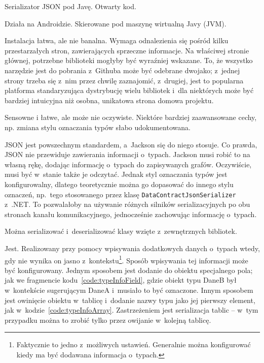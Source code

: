 \begin{description}
Serializator JSON pod Javę. Otwarty kod.

Działa na Androidzie. Skierowane pod maszynę wirtualną Javy (JVM).

Instalacja łatwa, ale nie banalna.
Wymaga odnalezienia się pośród kilku przestarzałych stron, zawierających sprzeczne informacje.
Na właściwej stronie głównej, potrzebne biblioteki mogłyby być wyraźniej wskazane.
To, że wszystko narzędzie jest do pobrania z~Githuba może być odebrane dwojako; z~jednej strony trzeba się z~nim przez chwilę zaznajomić, z~drugiej, jest to popularna platforma standaryzująca dystrybucję wielu bibliotek i~dla niektórych może być bardziej intuicyjna niż osobna, unikatowa strona domowa projektu.

Sensowne i łatwe, ale może nie oczywiste. Niektóre bardziej zaawansowane cechy, np. zmiana stylu oznaczania typów słabo udokumentowana.

JSON jest powszechnym standardem, a~Jackson się do niego stosuje.
Co prawda, JSON nie przewiduje zawierania informacji o~typach.
Jackson musi robić to na własną rękę, dodając informację o~typach do zapisywanych grafów. Oczywiście, musi być w~stanie także je odczytać.
Jednak styl oznaczania typów jest konfigurowalny, dlatego teoretycznie można go dopasować do innego stylu oznaczeń, np.\ tego stosowanego przez klasę \texttt{DataContractJsonSerializer} z~.NET\@.
To pozwalałoby na używanie różnych silników serializacyjnych po obu stronach kanału komunikacyjnego, jednocześnie zachowując informację o~typach.

Można serializować i~deserializować klasy wzięte z~zewnętrznych bibliotek.

Jest. Realizowany przy pomocy wpisywania dodatkowych danych o~typach wtedy, gdy nie wynika on jasno z~kontekstu\footnote{Faktycznie to jedno z~możliwych ustawień. Generalnie można konfigurować kiedy ma być dodawana informacja o~typach.}.
Sposób wpisywania tej informacji może być konfigurowany.
Jednym sposobem jest dodanie do obiektu specjalnego pola; jak we fragmencie kodu~\ref{code:typeInfoField}, gdzie obiekt typu DaneB był w~kontekście sugerującym DaneA i~musiało to być oznaczone.
Innym sposobem jest owinięcie obiektu w~tablicę i~dodanie nazwy typu jako jej pierwszy element, jak w~kodzie~\ref{code:typeInfoArray}.
Zastrzeżeniem jest serializacja tablic -- w~tym przypadku można to zrobić tylko przez owijanie w~kolejną tablicę.


\end{description}
